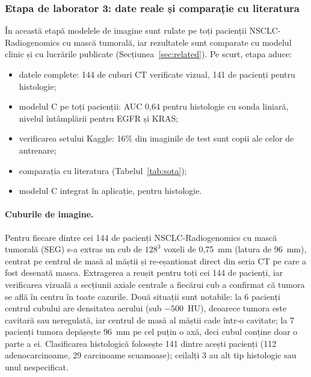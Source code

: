 \documentclass[11pt, a4paper]{article}
\begin{document}
\subsubsection{Etapa de laborator 3: date reale și comparație cu literatura}

În această etapă modelele de imagine sunt rulate pe toți pacienții NSCLC-Radiogenomics cu mască tumorală, iar rezultatele sunt comparate cu modelul clinic și cu lucrările publicate (Secțiunea~\ref{sec:related}). Pe scurt, etapa aduce:
\begin{itemize}
    \item datele complete: 144 de cuburi CT verificate vizual, 141 de pacienți pentru histologie;
    \item modelul C pe toți pacienții: AUC 0,64 pentru histologie cu sonda liniară, nivelul întâmplării pentru EGFR și KRAS;
    \item verificarea setului Kaggle: 16\% din imaginile de test sunt copii ale celor de antrenare;
    \item comparația cu literatura (Tabelul~\ref{tab:sota});
    \item modelul C integrat în aplicație, pentru histologie.
\end{itemize}

\paragraph{Cuburile de imagine.} Pentru fiecare dintre cei 144 de pacienți NSCLC-Radiogenomics cu mască tumorală (SEG) s-a extras un cub de $128^3$ voxeli de 0,75~mm (latura de 96~mm), centrat pe centrul de masă al măștii și re-eșantionat direct din seria CT pe care a fost desenată masca. Extragerea a reușit pentru toți cei 144 de pacienți, iar verificarea vizuală a secțiunii axiale centrale a fiecărui cub a confirmat că tumora se află în centru în toate cazurile. Două situații sunt notabile: la 6 pacienți centrul cubului are densitatea aerului (sub $-500$~HU), deoarece tumora este cavitară sau neregulată, iar centrul de masă al măștii cade într-o cavitate; la 7 pacienți tumora depășește 96~mm pe cel puțin o axă, deci cubul conține doar o parte a ei. Clasificarea histologică folosește 141 dintre acești pacienți (112 adenocarcinoame, 29 carcinoame scuamoase); ceilalți 3 au alt tip histologic sau unul nespecificat.
\end{document}
